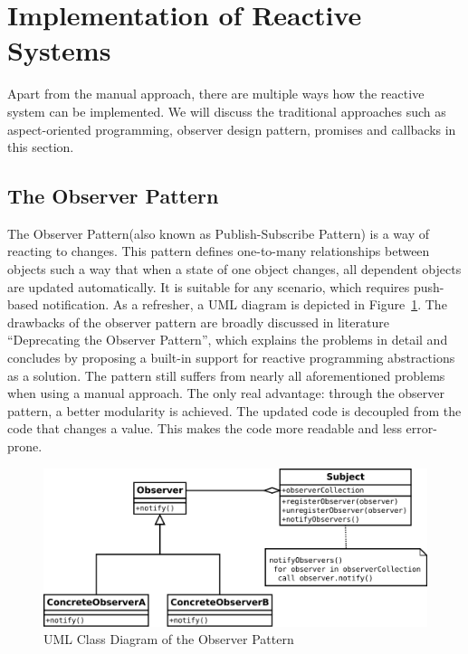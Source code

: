 \section {Implementation of Reactive Systems}
Apart from the manual approach, there are multiple ways how the reactive system can be implemented. We will discuss the traditional approaches such as aspect-oriented programming, observer design pattern, promises and callbacks in this section. 
	
\subsection{The Observer Pattern}
The Observer Pattern(also known as Publish-Subscribe Pattern)\cite{understandingObserverPattern} is a way of reacting to changes. 
This pattern defines one-to-many relationships between objects such a way that when a state of one object changes, all dependent objects are updated automatically. 
It is suitable for any scenario, which requires push-based notification\cite{understandingObserverPattern}. 
As a refresher, a UML diagram is depicted in Figure~\ref{fig:observer-uml}. The drawbacks of the observer pattern are broadly discussed in literature  ``Deprecating the Observer Pattern'', which explains the problems in detail and concludes by proposing a built-in support for reactive programming abstractions as a solution\cite{deprecatingTheObserverPattern}. 
The pattern still suffers from nearly all aforementioned problems when using a manual approach. 
The only real advantage: through the observer pattern, a better modularity is achieved. 
The updated code is decoupled from the code that changes a value. 
This makes the code more readable and less error-prone. 

\begin{figure}[!h]
	\centering
	\includegraphics[scale=0.5,trim=0 0 0 0]{images/observer-uml.png}
	\caption{UML Class Diagram of the Observer Pattern}
	\label{fig:observer-uml}
\end{figure}

